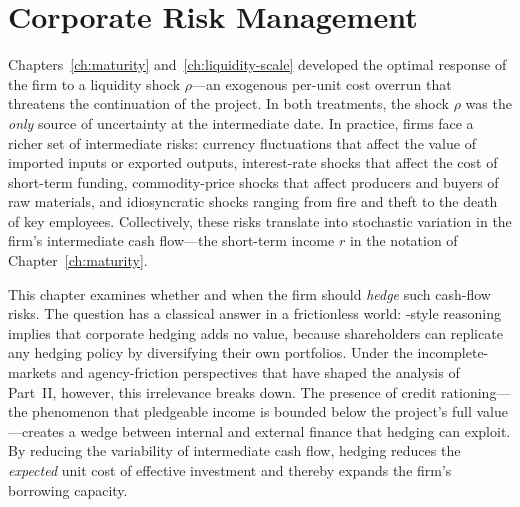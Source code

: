 \documentclass[11pt,a4paper,oneside]{book}
\theoremstyle{plain}
\theoremstyle{definition}
\theoremstyle{remark}
\numberwithin{equation}{chapter}
\begin{document}
\chapter{Corporate Risk Management}
\label{ch:risk-management}

Chapters~\ref{ch:maturity} and~\ref{ch:liquidity-scale} developed the optimal response of the firm to a liquidity shock $\rho$---an exogenous per-unit cost overrun that threatens the continuation of the project.
In both treatments, the shock $\rho$ was the \emph{only} source of uncertainty at the intermediate date.
In practice, firms face a richer set of intermediate risks: currency fluctuations that affect the value of imported inputs or exported outputs, interest-rate shocks that affect the cost of short-term funding, commodity-price shocks that affect producers and buyers of raw materials, and idiosyncratic shocks ranging from fire and theft to the death of key employees.
Collectively, these risks translate into stochastic variation in the firm's intermediate cash flow---the short-term income $r$ in the notation of Chapter~\ref{ch:maturity}.

This chapter examines whether and when the firm should \emph{hedge} such cash-flow risks.
The question has a classical answer in a frictionless world: \citet{ModiglianiMiller1958}-style reasoning implies that corporate hedging adds no value, because shareholders can replicate any hedging policy by diversifying their own portfolios.
Under the incomplete-markets and agency-friction perspectives that have shaped the analysis of Part~II, however, this irrelevance breaks down.
The presence of credit rationing---the phenomenon that pledgeable income is bounded below the project's full value---creates a wedge between internal and external finance that hedging can exploit.
By reducing the variability of intermediate cash flow, hedging reduces the \emph{expected} unit cost of effective investment and thereby expands the firm's borrowing capacity.
\end{document}
